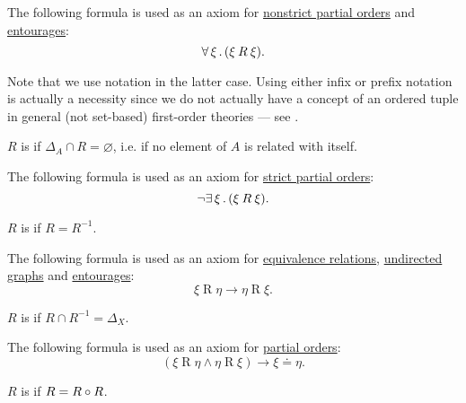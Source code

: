 \begin{definition}
\begin{thmenum}[resume=def:binary_relation]
    The following formula is used as an axiom for \hyperref[def:partially_ordered_set/nonstrict]{nonstrict partial orders} and \hyperref[def:entourage]{entourages}:
    \begin{equation}\label{eq:def:binary_relation/reflexive}
      \forall \thinspace \xi \thinspace . \thinspace (\xi \mathbin{R} \xi).
    \end{equation}

    Note that we use  notation in the latter case. Using either infix or prefix notation is actually a necessity since we do not actually have a concept of an ordered tuple in general (not set-based) first-order theories --- see .

     \( R \) is  if \( \Delta_A \cap R = \varnothing \), i.e. if no element of \( A \) is related with itself.

    The following formula is used as an axiom for \hyperref[def:partially_ordered_set/strict]{strict partial orders}:
    \begin{equation}\label{eq:def:binary_relation/irreflexive}
      \neg \exists \thinspace \xi \thinspace . \thinspace (\xi \mathbin{R} \xi).
    \end{equation}

     \( R \) is  if \( R = R^{-1} \).

    The following formula is used as an axiom for \hyperref[def:equivalence_relation]{equivalence relations}, \hyperref[def:undirected_multigraph]{undirected graphs} and \hyperref[def:entourage]{entourages}:
    \begin{equation}\label{eq:def:binary_relation/symmetric}
      \xi \mathbin{R} \eta \rightarrow \eta \mathbin{R} \xi.
    \end{equation}

     \( R \) is  if \( R \cap R^{-1} = \Delta_X \).

    The following formula is used as an axiom for \hyperref[def:partially_ordered_set]{partial orders}:
    \begin{equation}\label{eq:def:binary_relation/antisymmetric}
      (\xi \mathbin{R} \eta \wedge \eta \mathbin{R} \xi) \rightarrow \xi \doteq \eta.
    \end{equation}

     \( R \) is  if \( R = R \bincirc R \).


\end{thmenum}
\end{definition}
